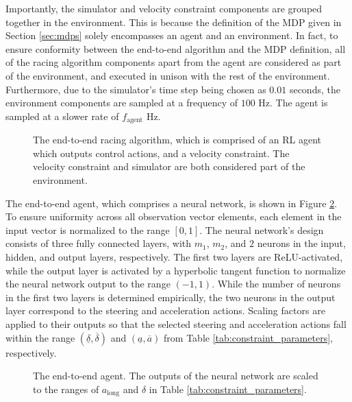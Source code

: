 Importantly, the simulator and velocity constraint components are grouped together in the environment.
This is because the definition of the MDP given in Section \ref{sec:mdps} solely encompasses an agent and an environment. 
In fact, to ensure conformity between the end-to-end algorithm and the MDP definition, 
all of the racing algorithm components apart from the agent are considered as part of the environment, and executed in unison with the rest of the environment.
Furthermore, due to the simulator's time step being chosen as $0.01$ seconds, the environment components are sampled at a frequency of $100$ Hz.
The agent is sampled at a slower rate of $f_{\text{agent}}$ Hz.

\begin{figure}[htb!]
    \centering
    
    \caption[The end-to-end driving architecture]{The end-to-end racing algorithm, which is comprised of an RL agent which outputs control actions, and a velocity constraint. The velocity constraint and simulator are both considered part of the environment.}
    \label{fig:end_to_end_architecture}
\end{figure}

The end-to-end agent, which comprises a neural network, is shown in Figure \ref{fig:actor_architecture}.
To ensure uniformity across all observation vector elements, each element in the input vector is normalized to the range $[0,1]$. 
The neural network's design consists of three fully connected layers, with $m_1$, $m_2$, and $2$ neurons in the input, hidden, and output layers, respectively. 
The first two layers are ReLU-activated, while the output layer is activated by a hyperbolic tangent function to normalize the neural network output to the range $(-1,1)$. 
While the number of neurons in the first two layers is determined empirically, the two neurons in the output layer correspond to the steering and acceleration actions. 
Scaling factors are applied to their outputs so that the selected steering and acceleration actions fall within the range $(\underline{\delta}, \overline{\delta})$ and $(\underline{a}, \overline{a})$ from Table \ref{tab:constraint_parameters}, respectively.

\begin{figure}[htb!]
    \centering
    
    \caption[The end-to-end agent]{The end-to-end agent. The outputs of the neural network are scaled to the ranges of $a_{\text{long}}$ and $\delta$ in Table \ref{tab:constraint_parameters}.}
    \label{fig:actor_architecture}
\end{figure}


